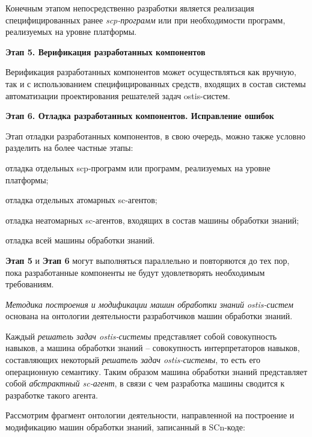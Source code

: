 Конечным этапом непосредственно разработки является реализация специфицированных ранее \textit{scp-программ} или при необходимости программ, реализуемых на уровне платформы.

\textbf{Этап 5. Верификация разработанных компонентов}

Верификация разработанных компонентов может осуществляться как вручную, так и с использованием специфицированных средств, входящих в состав системы автоматизации проектирования решателей задач ostis-систем.

\textbf{Этап 6. Отладка разработанных компонентов. Исправление ошибок}

Этап отладки разработанных компонентов, в свою очередь, можно также условно разделить на более частные этапы:

\begin{textitemize}
    \item отладка отдельных scp-программ или программ, реализуемых на уровне платформы;
    \item отладка отдельных атомарных sc-агентов;
    \item отладка неатомарных sc-агентов, входящих в состав машины обработки знаний;
    \item отладка всей машины обработки знаний.
\end{textitemize}

\textbf{Этап 5} и \textbf{Этап 6} могут выполняться параллельно и повторяются до тех пор, пока разработанные компоненты не будут удовлетворять необходимым требованиям.

\textit{Методика построения и модификации машин обработки знаний ostis-систем} основана на онтологии деятельности разработчиков машин обработки знаний.

Каждый \textit{решатель задач ostis-системы} представляет собой совокупность навыков, а машина обработки знаний -- совокупность интерпретаторов навыков, составляющих некоторый \textit{решатель задач ostis-системы}, то есть его операционную семантику. Таким образом машина обработки знаний представляет собой \textit{абстрактный sc-агент}, в связи с чем разработка машины сводится к разработке такого агента.

Рассмотрим фрагмент онтологии деятельности, направленной на построение и модификацию машин обработки знаний, записанный в SCn-коде:

